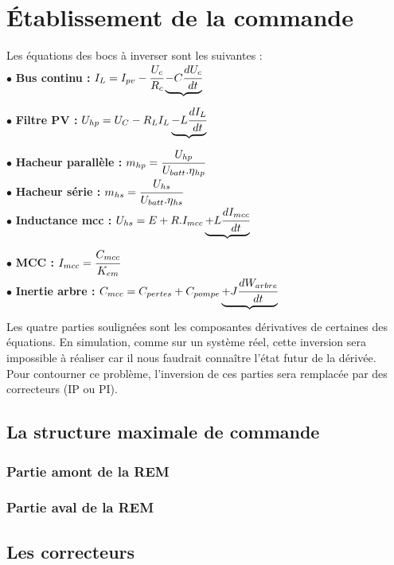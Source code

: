  
\section{Établissement de la commande}
Les équations des bocs à inverser sont les suivantes : \\
$ \bullet $ \textbf{Bus continu :} $I_L = I_{pv} - \cfrac{U_c}{R_c} \underbrace{- C\cfrac{dU_c}{dt}}_\text{} $\\
$ \bullet $ \textbf{Filtre PV :} $U_{hp} = U_C - R_LI_L \underbrace{- L\cfrac{dI_L}{dt}}_\text{} $\\
$ \bullet $ \textbf{Hacheur parallèle :} $m_{hp} = \cfrac{U_{hp}}{U_{batt}.\eta{}_{hp}} $\\
$ \bullet $ \textbf{Hacheur série :} $m_{hs} = \cfrac{U_{hs}}{U_{batt}.\eta{}_{hs}} $\\
$ \bullet $ \textbf{Inductance mcc :} $U_{hs} = E + R.I_{mcc} \underbrace{+ L\cfrac{dI_{mcc}}{dt}}_\text{} $\\
$ \bullet $ \textbf{MCC :} $I_{mcc} = \cfrac{C_{mcc}}{K_{em}} $\\
$ \bullet $ \textbf{Inertie arbre :} $C_{mcc} = C_{pertes} + C_{pompe} \underbrace{+ J\cfrac{dW_{arbre}}{dt}}_\text{}$\\


Les quatre parties soulignées sont les composantes dérivatives de certaines des équations. En simulation, comme sur un système réel, cette inversion sera impossible à réaliser car il nous faudrait connaître l'état futur de la dérivée.\\
Pour contourner ce problème, l'inversion de ces parties sera remplacée par des correcteurs (IP ou PI).\\
\subsection{La structure maximale de commande}

\subsubsection{Partie amont de la REM}

\subsubsection{Partie aval de la REM}

\subsection{Les correcteurs}
